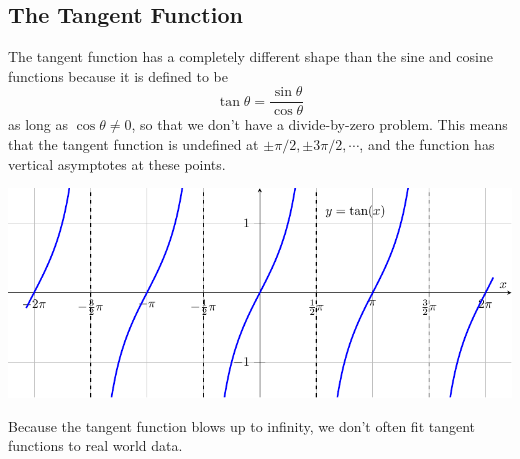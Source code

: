 






\subsection*{The Tangent Function}

The tangent function has a completely different shape than the sine and cosine functions because it is defined to be
\[ \tan \theta = \frac{\sin \theta}{\cos \theta} \]
as long as $\cos \theta \neq 0$, so that we don't have a divide-by-zero problem.  This
means that the tangent function is undefined at $\pm \pi/2, \pm 3 \pi/2, \cdots$, and the
function has vertical asymptotes at these points.
\begin{center}
    \includegraphics[width=0.8\columnwidth]{figures/0-5-fig11.pdf}
\end{center}
Because the tangent function blows up to infinity, we don't often fit tangent functions to real world data.

